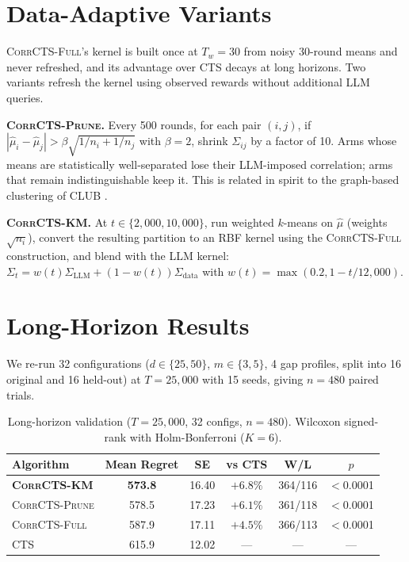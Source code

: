 \documentclass{article}
\theoremstyle{plain}
\theoremstyle{definition}
\theoremstyle{remark}
\newcommand{\CorrFull}{\textsc{CorrCTS-Full}}
\newcommand{\EdgePrune}{\textsc{CorrCTS-Prune}}
\newcommand{\KMRefine}{\textsc{CorrCTS-KM}}
\begin{document}
\section{Data-Adaptive Variants}\label{app:adaptive}

\CorrFull's kernel is built once at $T_w = 30$ from noisy 30-round means and never refreshed, and its advantage over CTS decays at long horizons.
Two variants refresh the kernel using observed rewards without additional LLM queries.

\textbf{\EdgePrune.}
Every 500 rounds, for each pair $(i, j)$, if $|\hat\mu_i - \hat\mu_j| > \beta \sqrt{1/n_i + 1/n_j}$ with $\beta = 2$, shrink $\Sigma_{ij}$ by a factor of 10.
Arms whose means are statistically well-separated lose their LLM-imposed correlation; arms that remain indistinguishable keep it.
This is related in spirit to the graph-based clustering of CLUB \citep{gentile2014online}.

\textbf{\KMRefine.}
At $t \in \{2{,}000, 10{,}000\}$, run weighted $k$-means on $\hat\mu$ (weights $\sqrt{n_i}$), convert the resulting partition to an RBF kernel using the \CorrFull{} construction, and blend with the LLM kernel: $\Sigma_t = w(t) \Sigma_{\mathrm{LLM}} + (1 - w(t)) \Sigma_{\mathrm{data}}$ with $w(t) = \max(0.2, 1 - t/12{,}000)$.

\section{Long-Horizon Results}\label{app:longhorizon}

We re-run 32 configurations ($d \in \{25, 50\}$, $m \in \{3, 5\}$, 4 gap profiles, split into 16 original and 16 held-out) at $T = 25{,}000$ with 15 seeds, giving $n = 480$ paired trials.

\begin{table}[h]
\caption{Long-horizon validation ($T{=}25{,}000$, 32 configs, $n{=}480$). Wilcoxon signed-rank \citep{wilcoxon1945individual} with Holm-Bonferroni \citep{holm1979simple} ($K{=}6$).}
\label{tab:longhorizon}
\centering
\small
\begin{tabular}{@{}lccccc@{}}
\toprule
Algorithm & Mean Regret & SE & vs CTS & W/L & $p$ \\
\midrule
\textbf{\KMRefine} & \textbf{573.8} & 16.40 & $+6.8\%$ & 364/116 & $<$0.0001 \\
\EdgePrune & 578.5 & 17.23 & $+6.1\%$ & 361/118 & $<$0.0001 \\
\CorrFull & 587.9 & 17.11 & $+4.5\%$ & 366/113 & $<$0.0001 \\
CTS & 615.9 & 12.02 & --- & --- & --- \\
\bottomrule
\end{tabular}
\end{table}
\end{document}

